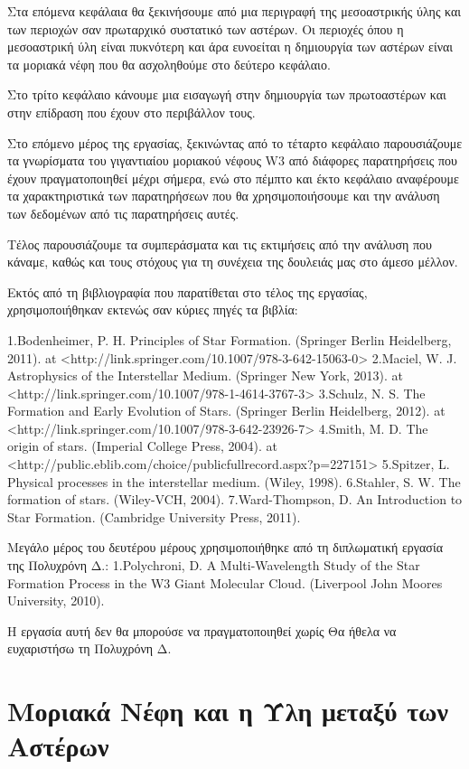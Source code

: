 \documentclass[a4paper,12pt]{memoir}
\begin{document}
Στα επόμενα κεφάλαια θα ξεκινήσουμε από μια περιγραφή της μεσοαστρικής ύλης και των περιοχών σαν πρωταρχικό συστατικό των αστέρων. Οι περιοχές όπου η μεσοαστρική ύλη είναι πυκνότερη και άρα ευνοείται η δημιουργία των αστέρων είναι τα μοριακά νέφη που θα ασχοληθούμε στο δεύτερο κεφάλαιο.

Στο τρίτο κεφάλαιο κάνουμε μια εισαγωγή στην δημιουργία των πρωτοαστέρων και στην επίδραση που έχουν στο περιβάλλον τους.

Στο επόμενο μέρος της εργασίας, ξεκινώντας από το τέταρτο κεφάλαιο παρουσιάζουμε τα γνωρίσματα του γιγαντιαίου μοριακού νέφους W3 από διάφορες παρατηρήσεις που έχουν πραγματοποιηθεί μέχρι σήμερα, ενώ στο πέμπτο και έκτο κεφάλαιο αναφέρουμε τα χαρακτηριστικά των παρατηρήσεων που θα χρησιμοποιήσουμε και την ανάλυση των δεδομένων από τις παρατηρήσεις αυτές.

Τέλος παρουσιάζουμε τα συμπεράσματα και τις εκτιμήσεις από την ανάλυση που κάναμε, καθώς και τους στόχους για τη συνέχεια της δουλειάς μας στο άμεσο μέλλον.

Εκτός από τη βιβλιογραφία που παρατίθεται στο τέλος της εργασίας, χρησιμοποιήθηκαν εκτενώς σαν κύριες πηγές τα βιβλία:

1.Bodenheimer, P. H. Principles of Star Formation. (Springer Berlin Heidelberg, 2011). at <http://link.springer.com/10.1007/978-3-642-15063-0>
2.Maciel, W. J. Astrophysics of the Interstellar Medium. (Springer New York, 2013). at <http://link.springer.com/10.1007/978-1-4614-3767-3>
3.Schulz, N. S. The Formation and Early Evolution of Stars. (Springer Berlin Heidelberg, 2012). at <http://link.springer.com/10.1007/978-3-642-23926-7>
4.Smith, M. D. The origin of stars. (Imperial College Press, 2004). at <http://public.eblib.com/choice/publicfullrecord.aspx?p=227151>
5.Spitzer, L. Physical processes in the interstellar medium. (Wiley, 1998).
6.Stahler, S. W. The formation of stars. (Wiley-VCH, 2004).
7.Ward-Thompson, D. An Introduction to Star Formation. (Cambridge University Press, 2011).

Μεγάλο μέρος του δευτέρου μέρους χρησιμοποιήθηκε από τη διπλωματική εργασία της Πολυχρόνη Δ.:
1.Polychroni, D. A Multi-Wavelength Study of the Star Formation Process in the W3 Giant Molecular Cloud. (Liverpool John Moores University, 2010).

\vfill

Η εργασία αυτή δεν θα μπορούσε να πραγματοποιηθεί χωρίς 
Θα ήθελα να ευχαριστήσω τη Πολυχρόνη Δ.

\chapter{Μοριακά Νέφη και η Ύλη μεταξύ των Αστέρων}
\end{document}
